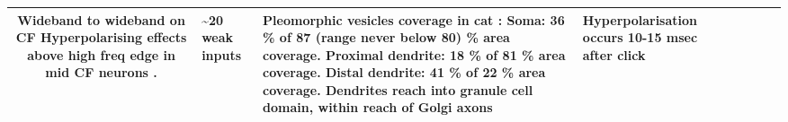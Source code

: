 \begin{longtable}{cYYYYYYY}
Wideband to wideband on CF \citep{EvansZhao:1998} 
Hyperpolarising effects above high freq edge in mid CF neurons \citep[rat][]{PaoliniClark:1999}.                    
& %
\~{}20 weak inputs\citep{SaintMorestEtAl:1989}                     
& %
Pleomorphic vesicles coverage in cat \citep{SmithRhode:1989}:
Soma: 36 \%  of 87 (range never below 80) \% area coverage. 
Proximal dendrite: 18 \%  of 81 \% area coverage.  
Distal dendrite: 41 \%  of 22 \% area coverage.   
Dendrites reach into granule cell domain, within reach of Golgi axons \citep{OertelWuEtAl:1990,ArnottWallaceEtAl:2004}     
& %
Hyperpolarisation occurs 10-15 msec after click \citep{PaoliniClark:1999}
\\ \midrule
\end{longtable}





